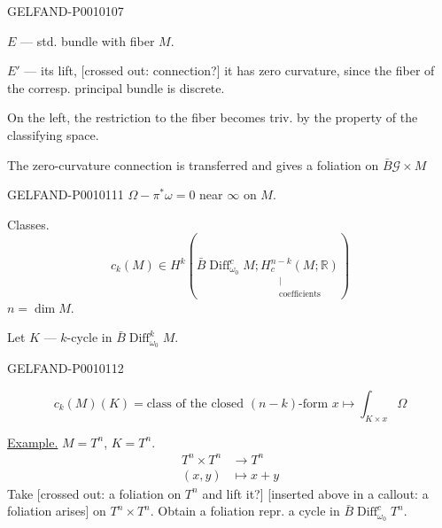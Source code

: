 \begin{GelfandAdjacentEvidence}{GELFAND-P001010}{7}


$E$ --- std. bundle with fiber $M$.

$E'$ --- its lift, [crossed out: connection?] it has zero curvature,
since the fiber of the corresp. principal bundle is discrete.
\end{GelfandAdjacentEvidence}


On the left, the restriction to the fiber becomes triv. by the property of the classifying space.

The zero-curvature connection is transferred and gives a foliation on $\bar B\mathcal G\times M$


\begin{GelfandAdjacentEvidence}{GELFAND-P001011}{1}
$\Omega-\pi^*\omega=0$ near $\infty$ on $M$.

Classes.
\[
c_k(M)\in H^k\left(\bar B\operatorname{Diff}^{c}_{\omega_0}M;
\underset{\substack{\vert\\\text{coefficients}}}{H_c^{n-k}(M;\mathbb R)}\right)
\]
$n=\dim M$.

Let $K$ --- $k$-cycle in $\bar B\operatorname{Diff}^{k}_{\omega_0}M$.
\end{GelfandAdjacentEvidence}
\begin{GelfandAdjacentEvidence}{GELFAND-P001011}{2}

\[
c_k(M)(K)=\text{class of the closed }(n-k)\text{-form }
 x\longmapsto\int_{K\times x}\Omega
\]

\underline{Example.} $M=T^n$, $K=T^n$.
\[
\begin{aligned}
T^n\times T^n&\longrightarrow T^n\\
(x,y)&\longmapsto x+y
\end{aligned}
\]
Take [crossed out: a foliation on $T^n$ and lift it?] [inserted above in a callout: a foliation arises]
on $T^n\times T^n$. Obtain a foliation repr. a cycle in $\bar B\operatorname{Diff}^{c}_{\omega_0}T^n$.
\end{GelfandAdjacentEvidence}
